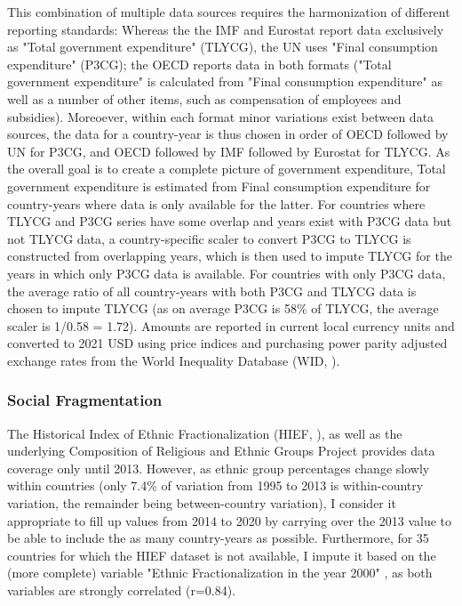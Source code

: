 \documentclass[11pt, authoryear]{elsarticle}
\begin{document}
This combination of multiple data sources requires the harmonization of different reporting standards: 
Whereas the the IMF and Eurostat report data exclusively as "Total government expenditure" (TLYCG), the UN uses "Final consumption expenditure" (P3CG); the OECD reports data in both formats ("Total government expenditure" is calculated from "Final consumption expenditure" as well as a number of other items, such as compensation of employees and subsidies). 
Moreoever, within each format minor variations exist between data sources, the data for a country-year is thus chosen in order of OECD followed by UN for P3CG, and OECD followed by IMF followed by Eurostat for TLYCG.
As the overall goal is to create a complete picture of government expenditure, Total government expenditure is estimated from Final consumption expenditure for country-years where data is only available for the latter.
For countries where TLYCG and P3CG series have some overlap and years exist with P3CG data but not TLYCG data, a country-specific scaler to convert P3CG to TLYCG is constructed from overlapping years, which is then used to impute TLYCG for the years in which only P3CG data is available.
For countries with only P3CG data, the average ratio of all country-years with both P3CG and TLYCG data is chosen to impute TLYCG (as on average P3CG is 58\% of TLYCG, the average scaler is 1/0.58 = 1.72). 
Amounts are reported in current local currency units and converted to 2021 USD using price indices and purchasing power parity adjusted exchange rates from the World Inequality Database (WID,  \citeyear{WID_2021_WID}).

\subsubsection{Social Fragmentation}

The Historical Index of Ethnic Fractionalization (HIEF, \cite{Drazanova_2020_HIEF}), as well as the underlying Composition of Religious and Ethnic Groups Project \citep{CREG_2012_whitepaper} provides data coverage only until 2013.
However, as ethnic group percentages change slowly within countries (only 7.4\% of variation from 1995 to 2013 is within-country variation, the remainder being between-country variation), I consider it appropriate to fill up values from 2014 to 2020 by carrying over the 2013 value to be able to include the as many country-years as possible.
Furthermore, for 35 countries for which the HIEF dataset is not available, I impute it based on the (more complete) variable "Ethnic Fractionalization in the year 2000" \citep{Alesina_etal_2003_fractionalization}, as both variables are strongly correlated (r=0.84).
\end{document}

